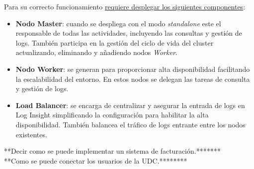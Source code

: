 \begin{itemize}
    Para su correcto funcionamiento \underline{requiere desplegar los siguientes componentes}:
    \begin{itemize}
        \item \textbf{Nodo Master}: cuando se despliega con el modo \textit{standalone} este el responsable de todas las actividades, incluyendo las consultas y gestión de logs. También participa en la gestión del ciclo de vida del cluster actualizando, eliminando y añadiendo nodos \textit{Worker}. 
        \item \textbf{Nodo Worker}: se generan para proporcionar alta disponibilidad facilitando la escalabilidad del entorno. En estos nodos se delegan las tareas de consulta y gestión de logs.
        \item \textbf{Load Balancer}: se encarga de centralizar y asegurar la entrada de logs en Log Insight simplificando la configuración para habilitar la alta disponibilidad. También balancea el tráfico de logs entrante entre los nodos existentes.
    \end{itemize}
\end{itemize}

**Decir como se puede implementar un sistema de facturación.*******\\
**Como se puede conectar los usuarios de la UDC.********

